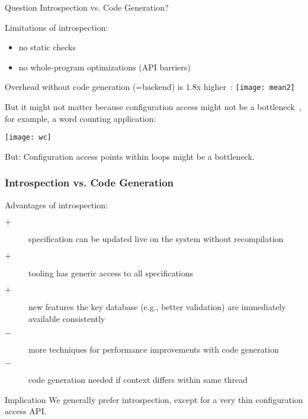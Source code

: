 
\begin{frame}
	\begin{alertblock}{Question}
	Introspection vs. Code Generation?
	\end{alertblock}
\end{frame}

\begin{frame}
	Limitations of introspection:
	\begin{itemize}
	\item no static checks
	\item no whole-program optimizations (API barriers)
	\end{itemize}
\end{frame}

\begin{frame}
	Overhead without code generation (=backend) is $1.8$x higher~\cite{raab2015kps}:
	\texttt{[image: mean2]}
\end{frame}

\begin{frame}
	But it might not matter because configuration access might not be a bottleneck~\cite{raab2015kps},
	for example, a word counting application:

	\texttt{[image: wc]}

	But: \pause
	Configuration access points within loops might be a bottleneck.
\end{frame}

\begin{frame}
	\frametitle{Introspection vs. Code Generation}
	
	Advantages of introspection:

	\begin{description}
	\item[$+$] specification can be updated live on the system without recompilation
	\item[$+$] tooling has generic access to all specifications
 	\item[$+$] new features the key database (e.g., better validation) are immediately available consistently
	\item[$-$] more techniques for performance improvements with code generation
	\item[$-$] code generation needed if context differs within same thread
	\end{description}

	\vspace{0.5em}

	\begin{alertblock}{Implication}
	We generally prefer introspection, except for a very thin configuration access API.
	\end{alertblock}
\end{frame}


